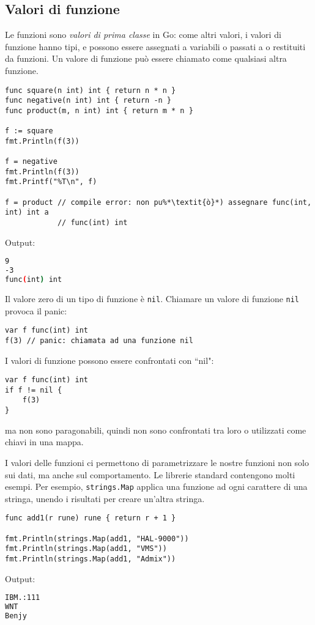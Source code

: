 \documentclass[../../thesis.tex]{subfiles}
\begin{document}
    \subsection{Valori di funzione}\label{subsec:valori-di-funzione}
    Le funzioni sono \textit{valori di prima classe} in Go: come altri valori, i valori di funzione hanno tipi, e possono essere assegnati a variabili o passati a o restituiti da funzioni.
    Un valore di funzione può essere chiamato come qualsiasi altra funzione.
    \begin{lstlisting}[frame = single, label = {lst:lstlisting4-5.1}]
func square(n int) int { return n * n }
func negative(n int) int { return -n }
func product(m, n int) int { return m * n }

f := square
fmt.Println(f(3))

f = negative
fmt.Println(f(3))
fmt.Printf("%T\n", f)

f = product // compile error: non pu%*\textit{ò}*) assegnare func(int, int) int a
            // func(int) int
    \end{lstlisting}
    Output:
    \begin{lstlisting}[language = bash, frame = L, label = {lst:lstlisting4-5.2}]
9
-3
func(int) int
    \end{lstlisting}
    Il valore zero di un tipo di funzione è \verb"nil".
    \clearpage
    \newpage
    Chiamare un valore di funzione \verb"nil" provoca il panic:
    \begin{lstlisting}[frame = single, label = {lst:lstlisting4-5.3}]
var f func(int) int
f(3) // panic: chiamata ad una funzione nil
    \end{lstlisting}
    I valori di funzione possono essere confrontati con ``nil":
    \begin{lstlisting}[frame = single, label = {lst:lstlisting4-5.4}]
var f func(int) int
if f != nil {
    f(3)
}
    \end{lstlisting}
    ma non sono paragonabili, quindi non sono confrontati tra loro o utilizzati come chiavi in una mappa.
    \hfill \vspace{12pt}

    I valori delle funzioni ci permettono di parametrizzare le nostre funzioni non solo sui dati, ma anche sul comportamento.
    Le librerie standard contengono molti esempi.
    Per esempio, \verb"strings.Map" applica una funzione ad ogni carattere di una stringa, unendo i risultati per creare un'altra stringa.
    \begin{lstlisting}[frame = single, label = {lst:lstlisting4-5.5}]
func add1(r rune) rune { return r + 1 }

fmt.Println(strings.Map(add1, "HAL-9000"))
fmt.Println(strings.Map(add1, "VMS"))
fmt.Println(strings.Map(add1, "Admix"))
    \end{lstlisting}
    Output:
    \begin{lstlisting}[language = bash, frame = L, label = {lst:lstlisting4-5.6}]
IBM.:111
WNT
Benjy
    \end{lstlisting}
\end{document}
